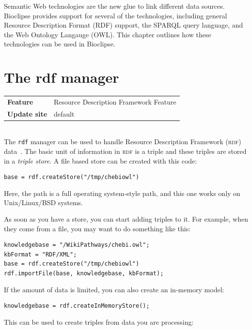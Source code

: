 \documentclass[a5paper, 10pt]{memoir}
\begin{document}
\begin{refsection}

Semantic Web technologies are the new glue to link different data sources. Bioclipse
provides support for several of the technologies, including general
Resource Description Format (RDF) support,
the SPARQL query language, and the Web Ontology Langauge
(OWL). This chapter outlines how these
technologies can be used in Bioclipse.

\section{The rdf manager}

\begin{tabular}{ll}
\textbf{Feature} & Resource Description Framework Feature \\
\textbf{Update site} & default \\
\end{tabular} \\

\noindent
The \texttt{rdf} manager can be used to handle Resource Description Framework
(\textsc{rdf}) data~\cite{willighagen2011linking}. The basic unit of
information in \textsc{rdf} is a triple and these triples are stored in a
\emph{triple store}. A file based store can be created with this
code:

\begin{Verbatim}
base = rdf.createStore("/tmp/chebiowl")
\end{Verbatim}
Here, the path is a full operating system-style path, and this one works only
on Unix/Linux/BSD systems.

As soon as you have a store, you can start adding triples to it. For example,
when they come from a file, you may want to do something like
this:

\begin{Verbatim}
knowledgebase = "/WikiPathways/chebi.owl";
kbFormat = "RDF/XML";
base = rdf.createStore("/tmp/chebiowl")
rdf.importFile(base, knowledgebase, kbFormat);
\end{Verbatim}
If the amount of data is limited, you can also create an
in-memory model:

\begin{Verbatim}
knowledgebase = rdf.createInMemoryStore();
\end{Verbatim}
This can be used to create triples from data you are
processing:


\end{refsection}
\end{document}
